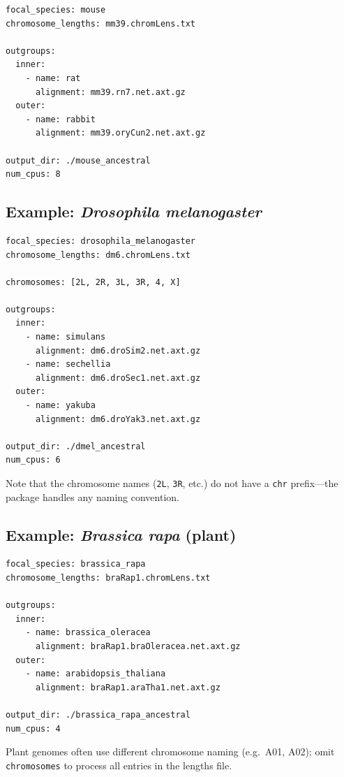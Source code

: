 \documentclass[11pt,a4paper]{article}
\begin{document}
\begin{lstlisting}[style=yamlstyle, caption={Hypothetical mouse configuration.}]
focal_species: mouse
chromosome_lengths: mm39.chromLens.txt

outgroups:
  inner:
    - name: rat
      alignment: mm39.rn7.net.axt.gz
  outer:
    - name: rabbit
      alignment: mm39.oryCun2.net.axt.gz

output_dir: ./mouse_ancestral
num_cpus: 8
\end{lstlisting}

\subsection{Example: \textit{Drosophila melanogaster}}

\begin{lstlisting}[style=yamlstyle, caption={Hypothetical \textit{Drosophila} configuration.}]
focal_species: drosophila_melanogaster
chromosome_lengths: dm6.chromLens.txt

chromosomes: [2L, 2R, 3L, 3R, 4, X]

outgroups:
  inner:
    - name: simulans
      alignment: dm6.droSim2.net.axt.gz
    - name: sechellia
      alignment: dm6.droSec1.net.axt.gz
  outer:
    - name: yakuba
      alignment: dm6.droYak3.net.axt.gz

output_dir: ./dmel_ancestral
num_cpus: 6
\end{lstlisting}

Note that the chromosome names (\texttt{2L}, \texttt{3R}, etc.) do not have a \texttt{chr} prefix---the package handles any naming convention.

\subsection{Example: \textit{Brassica rapa} (plant)}

\begin{lstlisting}[style=yamlstyle, caption={Hypothetical \textit{Brassica rapa} configuration.}]
focal_species: brassica_rapa
chromosome_lengths: braRap1.chromLens.txt

outgroups:
  inner:
    - name: brassica_oleracea
      alignment: braRap1.braOleracea.net.axt.gz
  outer:
    - name: arabidopsis_thaliana
      alignment: braRap1.araTha1.net.axt.gz

output_dir: ./brassica_rapa_ancestral
num_cpus: 4
\end{lstlisting}

Plant genomes often use different chromosome naming (e.g.\ A01, A02); omit \texttt{chromosomes} to process all entries in the lengths file.
\end{document}
